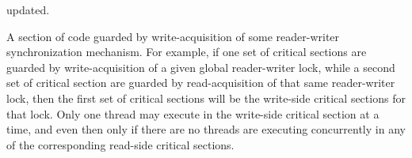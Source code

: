 \begin{description}
	updated.
\item[\IXGh{Write-Side}{Critical Section}:]
	A section of code guarded by write-acquisition of
	some reader-writer synchronization mechanism.
	For example, if one set of critical sections are guarded by
	write-acquisition of
	a given global reader-writer lock, while a second set of critical
	section are guarded by read-acquisition of that same reader-writer
	lock, then the first set of critical sections will be the
	write-side critical sections for that lock.
	Only one thread may execute in the write-side critical section
	at a time, and even then only if there are no threads are
	executing concurrently in any of the corresponding read-side
	critical sections.
\end{description}
